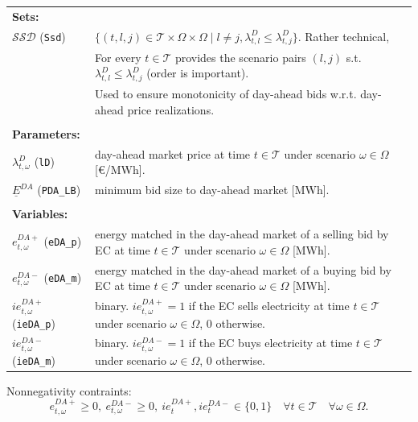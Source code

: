 \begin{tabularx}{\textwidth}{l X}
\textbf{Sets:} \\
$\mathcal{SSD}$ (\texttt{Ssd}) & $\{(t, l, j) \in \mathcal{T} \times \Omega \times \Omega \mid l \neq j, \lambda^D_{t, l} \leq \lambda^D_{t, j} \}$. Rather technical, \\
& For every $t \in \mathcal{T}$ provides the scenario pairs $(l, j)$ s.t. $\lambda^D_{t, l} \leq \lambda^D_{t, j}$ (order is important). \\ 
& Used to ensure monotonicity of day-ahead bids w.r.t. day-ahead price realizations. \\
\\

\textbf{Parameters:} \\
$\lambda^D_{t, \omega}$ (\texttt{lD}) & day-ahead market price at time $t \in \mathcal{T}$ under scenario $\omega \in \Omega$ [\euro/MWh]. \\ 
$\underline{E}^{DA}$ (\texttt{PDA\_LB}) & minimum bid size to day-ahead market [MWh]. \\
\\

\textbf{Variables:} \\
$e^{DA+}_{t, \omega}$ (\texttt{eDA\_p}) & energy matched in the day-ahead market of a selling bid by EC at time $t \in \mathcal{T}$ under scenario $\omega \in \Omega$ [MWh]. \\ 
$e^{DA-}_{t, \omega}$ (\texttt{eDA\_m}) & energy matched in the day-ahead market of a buying bid by EC at time $t \in \mathcal{T}$ under scenario $\omega \in \Omega$ [MWh]. \\ 
$ie^{DA+}_{t, \omega}$ (\texttt{ieDA\_p}) & binary. $ie^{DA+}_{t, \omega} = 1$ if the EC sells electricity at time $t \in \mathcal{T}$ under scenario $\omega \in \Omega$, $0$ otherwise. \\ 
$ie^{DA-}_{t, \omega}$ (\texttt{ieDA\_m}) & binary. $ie^{DA-}_{t, \omega} = 1$ if the EC buys electricity at time $t \in \mathcal{T}$ under scenario $\omega \in \Omega$, $0$ otherwise. \\
\end{tabularx}

Nonnegativity contraints:
\begin{equation} \label{EQ:DAVarDef1}
	e^{DA+}_{t, \omega} \geq 0, \ e^{DA-}_{t, \omega} \geq 0, \ ie^{DA+}_t, ie^{DA-}_t \in \{0, 1 \} \quad \forall t \in \mathcal{T} \quad \forall \omega \in \Omega.
\end{equation}

